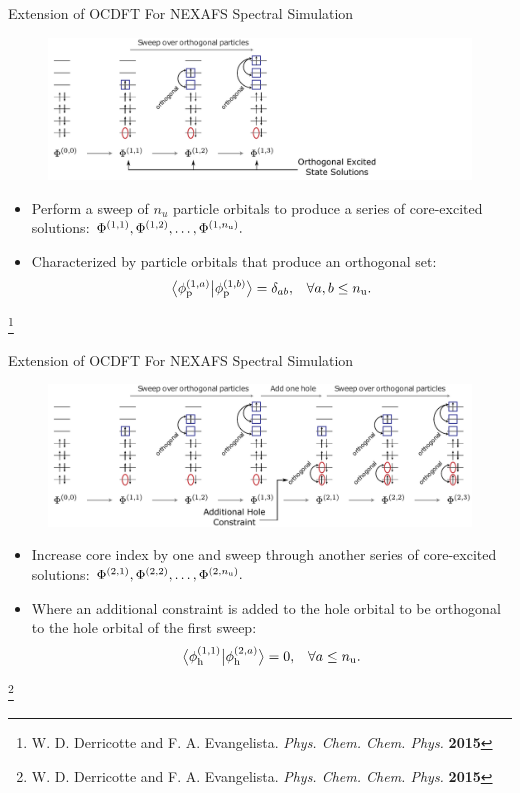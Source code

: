 \documentclass[t]{beamer}
\newcommand\blfootnote[1]{%
  \begingroup
  \renewcommand\thefootnote{}\footnote{#1}%
  \addtocounter{footnote}{-1}%
  \endgroup
}
\newcommand{\braket}[3][0]
{\ifthenelse{\equal{#1}{0}}{\left\langle #2 \middle| #3 \right\rangle}
{\ifthenelse{\equal{#1}{1}}{\big\langle #2 \big| #3 \big\rangle}
{\ifthenelse{\equal{#1}{2}}{\Big\langle #2 \Big| #3 \Big\rangle}
{\ifthenelse{\equal{#1}{3}}{\bigg\langle #2 \bigg| #3 \bigg\rangle}
{\ifthenelse{\equal{#1}{4}}{\Bigg\langle #2 \Bigg| #3 \Bigg\rangle}
{Error}}}}}
}
\begin{document}
\begin{frame}{Extension of OCDFT For NEXAFS Spectral Simulation}
\begin{figure}[!t]
\includegraphics[scale=0.65]{CMHP_alg2.pdf}
\end{figure}
\begin{itemize}
\item Perform a sweep of $n_u$ particle orbitals to produce a series of core-excited solutions: $\Phi^{(1,1)}, \Phi^{(1,2)}, \ldots, \Phi^{(1,n_{\rm u})}.$
\item Characterized by particle orbitals that produce an orthogonal set:
\begin{align}
\braket[1]{\phi^{(1,a)}_{\rm p}}{\phi^{(1,b)}_{\rm p}} &= \delta_{ab}, &\forall a,b \leq n_{\rm u}.
\end{align}
\end{itemize}
\blfootnote{W. D. Derricotte and F. A. Evangelista. \textit{Phys. Chem. Chem. Phys.} \textbf{2015}}
\end{frame}
\begin{frame}{Extension of OCDFT For NEXAFS Spectral Simulation}
\begin{figure}[!t]
\includegraphics[scale=0.65]{CMHP_alg3.pdf}
\end{figure}
\begin{itemize}
\item Increase core index by one and sweep through another series of core-excited solutions: $\Phi^{(2,1)}, \Phi^{(2,2)}, \ldots, \Phi^{(2,n_{\rm u})}.$
\item Where an additional constraint is added to the hole orbital to be orthogonal to the hole orbital of the first sweep:
\begin{align}
\braket[1]{\phi^{(1,1)}_{\rm h}}{\phi^{(2,a)}_{\rm h}} &=0,&\forall a \leq n_{\rm u}.
\end{align}
\end{itemize}
\blfootnote{W. D. Derricotte and F. A. Evangelista. \textit{Phys. Chem. Chem. Phys.} \textbf{2015}}
\end{frame}
\end{document}
